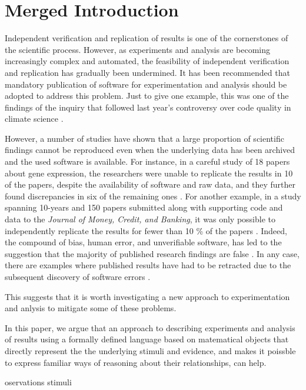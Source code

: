 \section*{Merged Introduction}

Independent verification and replication of results is one of the cornerstones
of the scientific process. However, as experiments and analysis are becoming
increasingly complex and automated, the feasibility of independent
verification and replication has gradually been undermined. It has been
recommended that mandatory publication of software for experimentation and
analysis should be adopted to address this problem. Just to give one example,
this was one of the findings of the inquiry that followed last year's
controversy over code quality in climate science \cite{XXX}.

However, a number of studies have shown that a large proportion of scientific
findings cannot be reproduced even when the underlying data has been archived
and the used software is available. For instance, in a careful study of 18
papers about gene expression, the researchers were unable to replicate the
results in 10 of the papers, despite the availability of software and raw
data, and they further found discrepancies in six of the remaining ones
\cite{XXX}. For another example, in a study spanning 10-years and 150 papers
submitted along with supporting code and data to the \textit{Journal of Money,
Credit, and Banking}, it was only possible to independently replicate the
results for fewer than 10 \% of the papers \cite{XXX}. Indeed, the compound of
bias, human error, and unverifiable software, has led to the suggestion that
the majority of published research findings are false \cite{}.
In any case, there are examples where published results have had to
be retracted due to the subsequent discovery of software errors \cite{XXX}.


This suggests that it is worth investigating a new approach to
experimentation and anlysis to mitigate some of these problems.

In this paper, we argue that an approach to describing experiments and
analysis of results using a formally defined language based on matematical
objects that directly represent the the underlying stimuli and evidence, and
makes it poissble to express familiar ways of reasoning about their
relationships, can help.


 oservations stimuli

